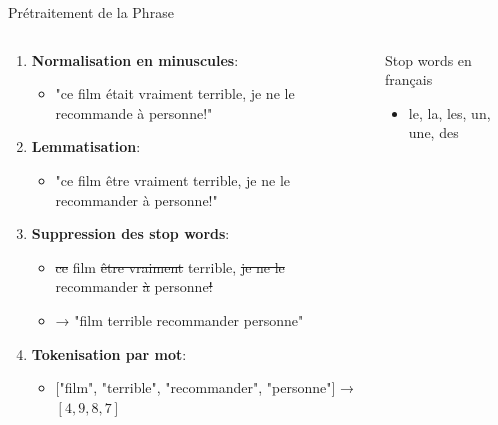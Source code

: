 \documentclass[aspectratio=169,11pt]{beamer}
\begin{document}
\begin{frame}{Prétraitement de la Phrase}
    \begin{columns}
        \begin{column}{0.6\textwidth}
            \begin{enumerate}
                \item \textbf{Normalisation en minuscules}:
                \begin{itemize}
                    \item "ce film était vraiment terrible, je ne le recommande à personne!"
                \end{itemize}
                \vspace{0.2cm}
                \item \textbf{Lemmatisation}:
                \begin{itemize}
                    \item "ce film être vraiment terrible, je ne le recommander à personne!"
                \end{itemize}
                \vspace{0.2cm}
                \item \textbf{Suppression des stop words}:
                \begin{itemize}
                    \item \sout{ce} film \sout{être vraiment} terrible, \sout{je ne le} recommander \sout{à} personne\sout{!}
                    \item → "film terrible recommander personne"
                \end{itemize}
                \vspace{0.2cm}
                \item \textbf{Tokenisation par mot}:
                \begin{itemize}
                    \item $[$"film", "terrible", "recommander", "personne"$]$ → $[4, 9, 8, 7]$
                \end{itemize}
            \end{enumerate}
        \end{column}
        \begin{column}{0.4\textwidth}
            \begin{alertblock}{Stop words en français}
                \small
                \begin{itemize}
                    \item le, la, les, un, une, des

\end{itemize}
\end{alertblock}
\end{column}
\end{columns}
\end{frame}
\end{document}
